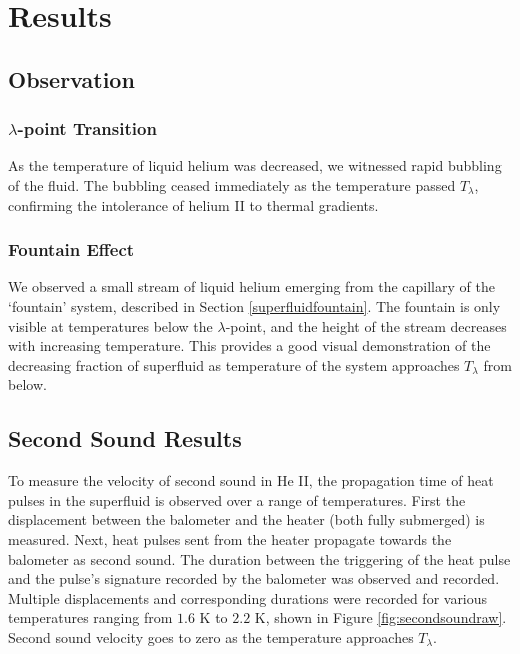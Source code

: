 
\section{Results}
\label{results}

\subsection{Observation}
\subsubsection{$\lambda$-point Transition}
As the temperature of liquid helium was decreased, we witnessed rapid
bubbling of the fluid. The bubbling ceased immediately as the
temperature passed $T_{\lambda}$, confirming the intolerance of helium
II to thermal gradients.

\subsubsection{Fountain Effect}
We observed a small stream of liquid helium emerging from the
capillary of the `fountain' system, described in Section
\ref{superfluidfountain}. The fountain is only visible at temperatures
below the $\lambda$-point, and the height of the stream decreases with
increasing temperature. This provides a good visual demonstration of
the decreasing fraction of superfluid as temperature of the system
approaches $T_{\lambda}$ from below.

\subsection{Second Sound Results}
\label{secondsoundresults}

To measure the velocity of second sound in He II, the propagation time of heat pulses in the superfluid is observed over a range of temperatures. First the displacement between the balometer and the heater (both fully submerged) is measured. Next, heat pulses sent from the heater propagate towards the balometer as second sound. The duration between the triggering of the heat pulse and the pulse's signature recorded by the balometer was observed and recorded. Multiple displacements and corresponding durations were recorded for various temperatures ranging from $1.6$ K to $2.2$ K, shown in Figure \ref{fig:secondsoundraw}. Second sound velocity goes to zero as the temperature approaches $T_{\lambda}$.


